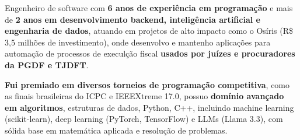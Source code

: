 \documentclass[a4paper,12pt]{article}
\begin{document}

Engenheiro de software com  \textbf{6 anos de experiência em programação} e mais de \textbf{2 anos em desenvolvimento backend,
inteligência artificial e engenharia de dados}, atuando em projetos de alto impacto como o Osíris (R\$ 3,5 milhões de investimento),
onde desenvolvo e mantenho aplicações para automação de processos de execulção fiscal
\textbf{usados por juízes e procuradores da PGDF e TJDFT}.

\textbf{Fui premiado em diversos torneios de programação competitiva}, como as finais brasileiras do ICPC e IEEEXtreme 17.0,
possuo \textbf{domínio avançado em algoritmos}, estruturas de dados, Python, C++, incluindo machine learning (scikit-learn),
deep learning (PyTorch, TensorFlow) e LLMs (Llama 3.3), com sólida base em matemática aplicada e resolução de problemas.
\end{document}
